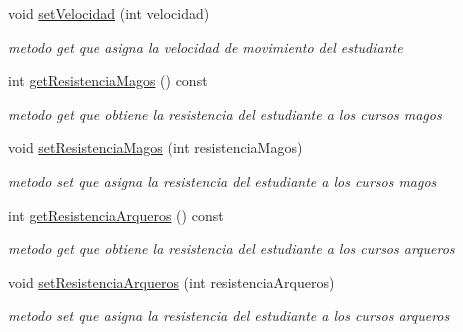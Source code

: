 \begin{DoxyCompactItemize}
\mbox{\label{classEstudiantes_af7faa51bcb2c7d90c1dba967144b590f}} 
void \hyperlink{classEstudiantes_af7faa51bcb2c7d90c1dba967144b590f}{set\+Velocidad} (int velocidad)
\begin{DoxyCompactList}\small\item\em metodo get que asigna la velocidad de movimiento del estudiante \end{DoxyCompactList}\item 
\mbox{\label{classEstudiantes_ae6fcb0bbd836fc8d97dad34e3c68b89a}} 
int \hyperlink{classEstudiantes_ae6fcb0bbd836fc8d97dad34e3c68b89a}{get\+Resistencia\+Magos} () const
\begin{DoxyCompactList}\small\item\em metodo get que obtiene la resistencia del estudiante a los cursos magos \end{DoxyCompactList}\item 
\mbox{\label{classEstudiantes_a2023f3df8e1e27aa952e6a89e4bb7c60}} 
void \hyperlink{classEstudiantes_a2023f3df8e1e27aa952e6a89e4bb7c60}{set\+Resistencia\+Magos} (int resistencia\+Magos)
\begin{DoxyCompactList}\small\item\em metodo set que asigna la resistencia del estudiante a los cursos magos \end{DoxyCompactList}\item 
\mbox{\label{classEstudiantes_aa757ce25ebcd94a1773c5526e51a3e14}} 
int \hyperlink{classEstudiantes_aa757ce25ebcd94a1773c5526e51a3e14}{get\+Resistencia\+Arqueros} () const
\begin{DoxyCompactList}\small\item\em metodo get que obtiene la resistencia del estudiante a los cursos arqueros \end{DoxyCompactList}\item 
\mbox{\label{classEstudiantes_ae3587a58875e79713dff1c22b5bfe95d}} 
void \hyperlink{classEstudiantes_ae3587a58875e79713dff1c22b5bfe95d}{set\+Resistencia\+Arqueros} (int resistencia\+Arqueros)
\begin{DoxyCompactList}\small\item\em metodo set que asigna la resistencia del estudiante a los cursos arqueros \end{DoxyCompactList}\item 

\end{DoxyCompactItemize}

